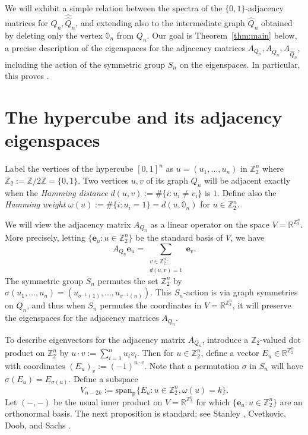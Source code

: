 \documentclass[10pt]{amsart}
\theoremstyle{plain}
\newcommand{\zero}{\mathbb{0}}
\newcommand{\ee}{\mathbf{e}}
\newcommand{\ZZ}{\mathbb{Z}}
\newcommand{\RR}{\mathbb{R}}
\newcommand{\spn}{\mathrm{span}}
\begin{document}
We will exhibit a simple relation between the spectra of the $\{0,1\}$-adjacency matrices for $Q_n, \hat{\hat{Q}}_n$, and extending also to the intermediate graph $\hat{Q}_n$ obtained by deleting only the vertex $\zero_n$ from $Q_n$.  Our goal is Theorem~\ref{thm:main} below,
a precise description of the  eigenspaces for the adjacency matrices  $A_{Q_n}, A_{\hat{Q}_n}, A_{\hat{\hat{Q}}_n}$, including the action of the symmetric group $S_n$ on the eigenspaces.
In particular, this proves \cite[Conj.~3.3]{schoenzeit}. 

\section{The hypercube and its adjacency eigenspaces}
\label{sec:hypercube-review}

Label the vertices of
the hypercube $[0,1]^n$
as $u=(u_1,\ldots,u_n)$ in $\ZZ_2^n$ where 
$
\ZZ_2:=\ZZ/2\ZZ=\{0,1\}.
$
Two vertices $u,v$ of its graph $Q_n$ will be adjacent exactly when the {\it Hamming distance}
$d(u,v):=\#\{i:u_i \neq v_i\}$ is $1$.
Define also the {\it Hamming weight}
$\omega(u):=\#\{i:u_i=1\}=d(u,\zero_n)$
for $u \in \ZZ_2^n$.

We will view the adjacency matrix $A_{Q_n}$ as a linear operator on the space $V=\RR^{\ZZ_2^n}$. 
More precisely, letting \( \{\ee_u: u\in \ZZ_2^n\} \) be
  the standard basis of \( V \), we have
  \begin{equation}\label{eq:AQn}
    A_{Q_n} \ee_u = \sum_{\substack{v \in \ZZ_2^n:\\ d(u,v)=1}} \ee_v.
  \end{equation}
The symmetric group $S_n$ permutes the set $\ZZ_2^n$
  by \( \sigma(u_1,\dots,u_n) = (u_{\sigma^{-1}(1)},\dots,u_{\sigma^{-1}(n)}) \).
  This $S_n$-action is via  graph symmetries on $Q_n$,
  and thus when $S_n$ permutes the coordinates in $V=\RR^{\ZZ_2^n}$, it will preserve the eigenspaces for the adjacency matrices $A_{Q_n}$.


To describe eigenvectors for the adjacency
matrix $A_{Q_n}$, introduce a $\ZZ_2$-valued dot product on $\ZZ_2^n$ by
$u\cdot v:=\sum_{i=1}^n u_i v_i$.
Then for $u \in \ZZ_2^n$, define a vector $E_u \in \RR^{\ZZ_2^n}$ with coordinates 
$(E_u)_v:=(-1)^{u \cdot v}$.
Note that a permutation $\sigma$ in $S_n$ will have
$\sigma(E_u)=E_{\sigma(u)}$. 
Define a subspace 
\begin{equation}
\label{eq:hypercube-eigenspaces}
V_{n-2k} := \spn_\RR\{E_u: u \in \ZZ_2^n, \omega(u)=k\}.
\end{equation}
Let $(-,-)$ be the usual inner product on  $V=\RR^{\ZZ_2^n}$ for which
$\{\ee_u: u\in \ZZ_2^n\}$
are an orthonormal basis.
The next proposition is standard;  see Stanley \cite[Chapter~2]{Stanley-undergrad-text},   
Cvetkovic, Doob, and Sachs \cite[\S2.6, Example~10]{CvetkovicDoobSachs}.
\end{document}
